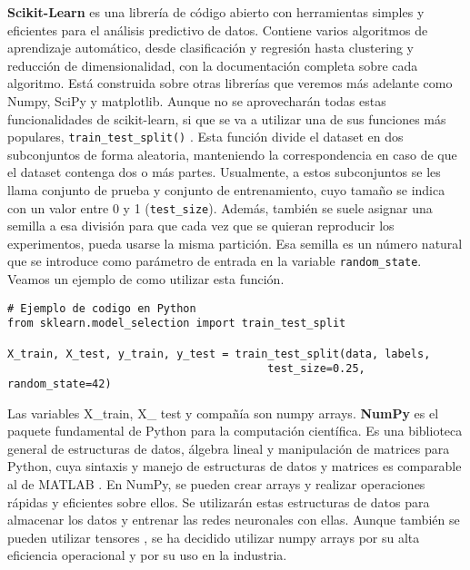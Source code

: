 \textbf{Scikit-Learn} \citep{scikitlearn} es una librería de código abierto con herramientas simples y eficientes para el análisis predictivo de datos. Contiene varios algoritmos de aprendizaje automático, desde clasificación y regresión hasta clustering y reducción de dimensionalidad, con la documentación completa sobre cada algoritmo. Está construida sobre otras librerías que veremos más adelante como Numpy, SciPy y matplotlib. Aunque no se aprovecharán todas estas funcionalidades de scikit-learn, si que se va a utilizar una de sus funciones más populares, \texttt{train\_test\_split()} \citep{traintestsplit}. Esta función divide el dataset en dos subconjuntos de forma aleatoria, manteniendo la correspondencia en caso de que el dataset contenga dos o más partes. Usualmente, a estos subconjuntos se les llama conjunto de prueba y conjunto de entrenamiento, cuyo tamaño se indica con un valor entre 0 y 1 (\texttt{test\_size}). Además, también se suele asignar una semilla a esa división para que cada vez que se quieran reproducir los experimentos, pueda usarse la misma partición. Esa semilla es un número natural que se introduce como parámetro de entrada en la variable \texttt{random\_state}. Veamos un ejemplo de como utilizar esta función.


\lstset{language=Python}
\begin{lstlisting}
# Ejemplo de codigo en Python
from sklearn.model_selection import train_test_split

X_train, X_test, y_train, y_test = train_test_split(data, labels,
                                        test_size=0.25, random_state=42)
\end{lstlisting}


Las variables X\_train, X\_ test y compañía son numpy arrays. \textbf{NumPy} \citep{numpy} es el paquete fundamental de Python para la computación científica. Es una biblioteca general de estructuras de datos, álgebra lineal y manipulación de matrices para Python, cuya sintaxis y manejo de estructuras de datos y matrices es comparable al de MATLAB \citep{bloice2016tutorial}. En NumPy, se pueden crear arrays y realizar operaciones rápidas y eficientes sobre ellos. Se utilizarán estas estructuras de datos para almacenar los datos y entrenar las redes neuronales con ellas. Aunque también se pueden utilizar tensores \citep{modeltraining}, se ha decidido utilizar numpy arrays por su alta eficiencia operacional y por su uso en la industria.


